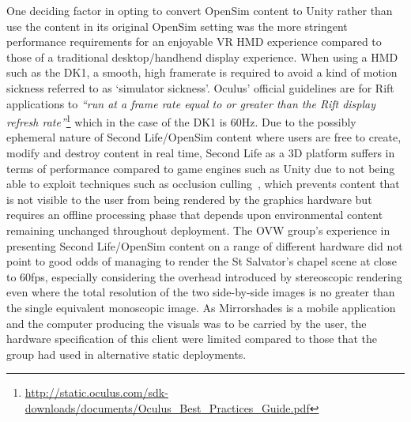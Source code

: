 One deciding factor in opting to convert OpenSim content to Unity rather than use the content in its original OpenSim setting was the more stringent performance requirements for an enjoyable VR HMD experience compared to those of a traditional desktop/handhend display experience. When using a HMD such as the DK1, a smooth, high framerate is required to avoid a kind of motion sickness referred to as `simulator sickness'. Oculus' official guidelines are for Rift applications to \textit{``run at a frame rate equal to or greater than the Rift display refresh rate''}\footnote{\url{http://static.oculus.com/sdk-downloads/documents/Oculus_Best_Practices_Guide.pdf}} which in the case of the DK1 is 60Hz. Due to the possibly ephemeral nature of Second Life/OpenSim content where users are free to create, modify and destroy content in real time, Second Life as a 3D platform suffers in terms of performance compared to game engines such as Unity due to not being able to exploit techniques such as occlusion culling~\cite{willmott:largecomplex}, which prevents content that is not visible to the user from being rendered by the graphics hardware but requires an offline processing phase that depends upon environmental content remaining unchanged throughout deployment. The OVW group's experience in presenting Second Life/OpenSim content on a range of different hardware did not point to good odds of managing to render the St Salvator's chapel scene at close to 60fps, especially considering the overhead introduced by stereoscopic rendering even where the total resolution of the two side-by-side images is no greater than the single equivalent monoscopic image. As Mirrorshades is a mobile application and the computer producing the visuals was to be carried by the user, the hardware specification of this client were limited compared to those that the group had used in alternative static deployments.


